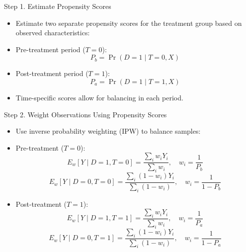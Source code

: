 \documentclass{beamer}
\begin{document}
\begin{frame}{Step 1. Estimate Propensity Scores}
\begin{itemize}
  \item Estimate two separate propensity scores for the treatment group based on observed characteristics:
  \item Pre-treatment period ($T = 0$):
  \begin{equation*}
    P_b = \Pr(D=1 \mid T=0, X)
  \end{equation*}
  \item Post-treatment period ($T = 1$):
  \begin{equation*}
    P_a = \Pr(D=1 \mid T=1, X)
  \end{equation*}
  \item Time-specific scores allow for balancing in each period.
\end{itemize}
\end{frame}

\begin{frame}{Step 2. Weight Observations Using Propensity Scores}
\begin{itemize}
  \item Use inverse probability weighting (IPW) to balance samples:
  \item Pre-treatment ($T = 0$):
  \begin{equation*}
    E_w[Y \mid D = 1, T = 0] = \frac{\sum_{i} w_{i} Y_{i}}{\sum_{i} w_{i}}, \quad w_{i} = \frac{1}{P_b}
  \end{equation*}
  \begin{equation*}
    E_w[Y \mid D = 0, T = 0] = \frac{\sum_{i} (1 - w_{i}) Y_{i}}{\sum_{i} (1 - w_{i})}, \quad w_{i} = \frac{1}{1 - P_b}
  \end{equation*}
  \item Post-treatment ($T = 1$):
  \begin{equation*}
    E_w[Y \mid D = 1, T = 1] = \frac{\sum_{i} w_{i} Y_{i}}{\sum_{i} w_{i}}, \quad w_{i} = \frac{1}{P_a}
  \end{equation*}
  \begin{equation*}
    E_w[Y \mid D = 0, T = 1] = \frac{\sum_{i} (1 - w_{i}) Y_{i}}{\sum_{i} (1 - w_{i})}, \quad w_{i} = \frac{1}{1 - P_a}
  \end{equation*}
\end{itemize}
\end{frame}
\end{document}
